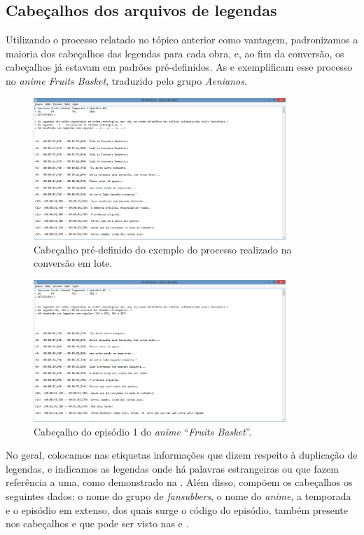 \documentclass[portuguese]{textolivre}
\begin{document}
\subsection{Cabeçalhos dos arquivos de legendas}\label{sec-idioma}
Utilizando o processo relatado no tópico anterior como vantagem, padronizamos a maioria dos cabeçalhos das legendas para cada obra, e, ao fim da conversão, os cabeçalhos já estavam em padrões pré-definidos. As  e  exemplificam esse processo no \textit{anime Fruits Basket}, traduzido pelo grupo \textit{Aenianos}.

\begin{figure}[htbp]
 \centering
 \includegraphics[width=0.85\textwidth]{Fig28.png}
 \caption{Cabeçalho pré-definido do exemplo do processo realizado na conversão em lote.}
 \label{fig28}
\end{figure}

\begin{figure}[htbp]
 \centering
 \includegraphics[width=0.85\textwidth]{Fig29.png}
 \caption{Cabeçalho do episódio 1 do \textit{anime} “\textit{Fruits Basket}”.}
 \label{fig29}
\end{figure}

No geral, colocamos nas etiquetas informações que dizem respeito à duplicação de legendas, e indicamos as legendas onde há palavras estrangeiras ou que fazem referência a uma, como demonstrado na . Além disso, compõem os cabeçalhos os seguintes dados: o nome do grupo de \textit{fansubbers}, o nome do \textit{anime}, a temporada e o episódio em extenso, dos quais surge o código do episódio, também presente nos cabeçalhos e que pode ser visto nas  e .
\end{document}

